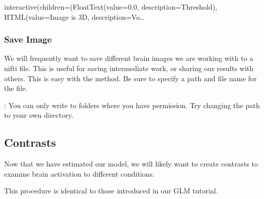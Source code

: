 \documentclass[letterpaper,10pt,english]{sphinxmanual}
\begin{document}
\begin{sphinxVerbatim}[commandchars=\\\{\}]
\PYG{p}{[}\PYG{p}{]}\PYG{p}{[}\PYG{p}{]}
\end{sphinxVerbatim}

\begin{sphinxVerbatim}[commandchars=\\\{\}]
interactive(children=(FloatText(value=0.0, description=\PYGZsq{}Threshold\PYGZsq{}), HTML(value=\PYGZsq{}Image is 3D\PYGZsq{}, description=\PYGZsq{}Vo…
\end{sphinxVerbatim}


\subsubsection{Save Image}
\label{\detokenize{content/GLM_Single_Subject_Model:save-image}}
We will frequently want to save different brain images we are working with to a nifti file. This is useful for saving intermediate work, or sharing our results with others. This is easy with the  method. Be sure to specify a path and file name for the file.

: You can only write to folders where you have permission. Try changing the path to your own directory.

\begin{sphinxVerbatim}[commandchars=\\\{\}]
\end{sphinxVerbatim}


\subsection{Contrasts}
\label{\detokenize{content/GLM_Single_Subject_Model:contrasts}}
Now that we have estimated our model, we will likely want to create contrasts to examine brain activation to different conditions.

This procedure is identical to those introduced in our GLM tutorial.
\end{document}
